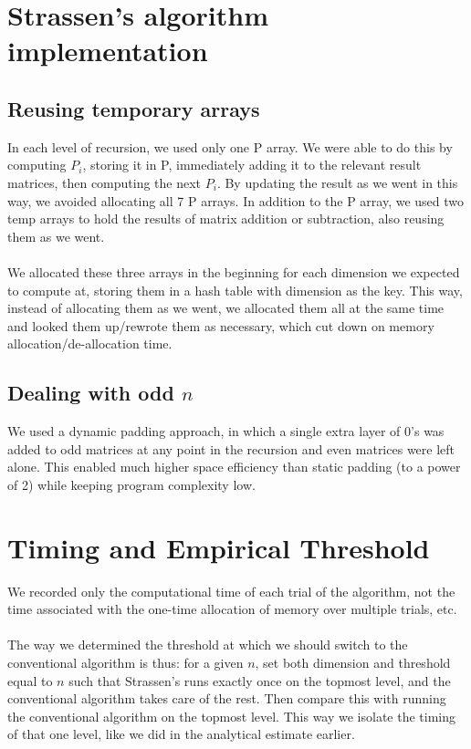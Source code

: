 \documentclass[10pt]{article}
\begin{document}
\section {Strassen's algorithm implementation}

\subsection{Reusing temporary arrays}
In each level of recursion, we used only one P array. We were able to do this by computing $P_i$, storing it in P, immediately adding it to the relevant result matrices, then computing the next $P_i$. By updating the result as we went in this way, we avoided allocating all 7 P arrays. In addition to the P array, we used two temp arrays to hold the results of matrix addition or subtraction, also reusing them as we went. \\
\\
We allocated these three arrays in the beginning for each dimension we expected to compute at, storing them in a hash table with dimension as the key. This way, instead of allocating them as we went, we allocated them all at the same time and looked them up/rewrote them as necessary, which cut down on memory allocation/de-allocation time. 

\subsection{Dealing with odd $n$}
We used a dynamic padding approach, in which a single extra layer of 0's was added to odd matrices at any point in the recursion and even matrices were left alone. This enabled much higher space efficiency than static padding (to a power of 2) while keeping program complexity low. 

\section {Timing and Empirical Threshold}
We recorded only the computational time of each trial of the algorithm, not the time associated with the one-time allocation of memory over multiple trials, etc. \\
\\
The way we determined the threshold at which we should switch to the conventional algorithm is thus: for a given $n$, set both dimension and threshold equal to $n$ such that Strassen's runs exactly once on the topmost level, and the conventional algorithm takes care of the rest. Then compare this with running the conventional algorithm on the topmost level. This way we isolate the timing of that one level, like we did in the analytical estimate earlier. 
\end{document}
